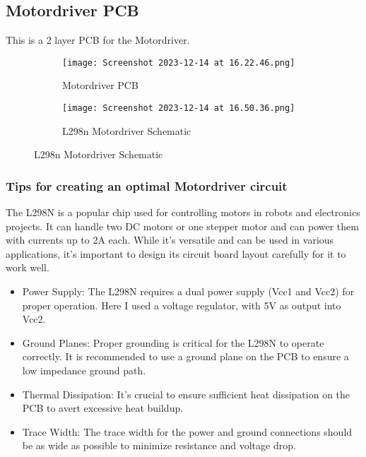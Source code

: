 \documentclass[../report.tex]{subfiles}
\begin{document}
\subsection{Motordriver PCB}
This is a 2 layer PCB for the Motordriver. 
\begin{figure}[H]
    \centering
    \begin{subfigure}[b]{0.4\linewidth}
      \texttt{[image: Screenshot 2023-12-14 at 16.22.46.png]}
      \caption{Motordriver PCB} 
    \end{subfigure}
    \begin{subfigure}[b]{0.4\linewidth}
      \texttt{[image: Screenshot 2023-12-14 at 16.50.36.png]}
      \caption{L298n Motordriver Schematic}
    \end{subfigure}
  \end{figure}

  \subsubsection{Tips for creating an optimal Motordriver circuit}
  The L298N is a popular chip used for controlling motors in robots and electronics projects. It can handle two DC motors or one stepper motor and can power them with currents up to 2A each. While it's versatile and can be used in various applications, it's important to design its circuit board layout carefully for it to work well. 
  \begin{itemize}
    \item Power Supply: The L298N requires a dual power supply (Vcc1 and Vcc2) for proper operation. Here I used a voltage regulator, with 5V as output into Vcc2. 
    \item Ground Planes: Proper grounding is critical for the L298N to operate correctly. It is recommended to use a ground plane on the PCB to ensure a low impedance ground path.
    \item Thermal Dissipation: It's crucial to ensure sufficient heat dissipation on the PCB to avert excessive heat buildup. 
    \item Trace Width: The trace width for the power and ground connections should be as wide as possible to minimize resistance and voltage drop.
\end{itemize} 
\end{document}
